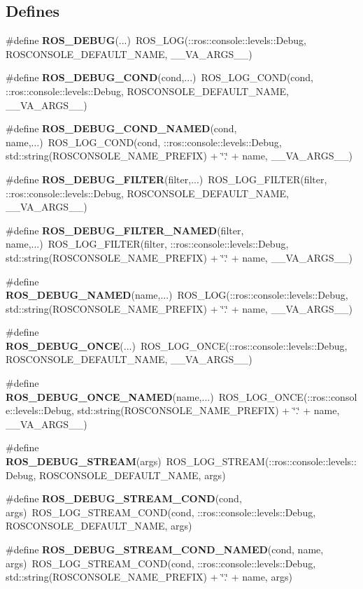 \subsection*{Defines}
\begin{DoxyCompactItemize}
\item 
\#define {\bf ROS\_\-DEBUG}(...)~ROS\_\-LOG(::ros::console::levels::Debug, ROSCONSOLE\_\-DEFAULT\_\-NAME, \_\-\_\-VA\_\-ARGS\_\-\_\-)
\item 
\#define {\bf ROS\_\-DEBUG\_\-COND}(cond,...)~ROS\_\-LOG\_\-COND(cond, ::ros::console::levels::Debug, ROSCONSOLE\_\-DEFAULT\_\-NAME, \_\-\_\-VA\_\-ARGS\_\-\_\-)
\item 
\#define {\bf ROS\_\-DEBUG\_\-COND\_\-NAMED}(cond, name,...)~ROS\_\-LOG\_\-COND(cond, ::ros::console::levels::Debug, std::string(ROSCONSOLE\_\-NAME\_\-PREFIX) + \char`\"{}.\char`\"{} + name, \_\-\_\-VA\_\-ARGS\_\-\_\-)
\item 
\#define {\bf ROS\_\-DEBUG\_\-FILTER}(filter,...)~ROS\_\-LOG\_\-FILTER(filter, ::ros::console::levels::Debug, ROSCONSOLE\_\-DEFAULT\_\-NAME, \_\-\_\-VA\_\-ARGS\_\-\_\-)
\item 
\#define {\bf ROS\_\-DEBUG\_\-FILTER\_\-NAMED}(filter, name,...)~ROS\_\-LOG\_\-FILTER(filter, ::ros::console::levels::Debug, std::string(ROSCONSOLE\_\-NAME\_\-PREFIX) + \char`\"{}.\char`\"{} + name, \_\-\_\-VA\_\-ARGS\_\-\_\-)
\item 
\#define {\bf ROS\_\-DEBUG\_\-NAMED}(name,...)~ROS\_\-LOG(::ros::console::levels::Debug, std::string(ROSCONSOLE\_\-NAME\_\-PREFIX) + \char`\"{}.\char`\"{} + name, \_\-\_\-VA\_\-ARGS\_\-\_\-)
\item 
\#define {\bf ROS\_\-DEBUG\_\-ONCE}(...)~ROS\_\-LOG\_\-ONCE(::ros::console::levels::Debug, ROSCONSOLE\_\-DEFAULT\_\-NAME, \_\-\_\-VA\_\-ARGS\_\-\_\-)
\item 
\#define {\bf ROS\_\-DEBUG\_\-ONCE\_\-NAMED}(name,...)~ROS\_\-LOG\_\-ONCE(::ros::console::levels::Debug, std::string(ROSCONSOLE\_\-NAME\_\-PREFIX) + \char`\"{}.\char`\"{} + name, \_\-\_\-VA\_\-ARGS\_\-\_\-)
\item 
\#define {\bf ROS\_\-DEBUG\_\-STREAM}(args)~ROS\_\-LOG\_\-STREAM(::ros::console::levels::Debug, ROSCONSOLE\_\-DEFAULT\_\-NAME, args)
\item 
\#define {\bf ROS\_\-DEBUG\_\-STREAM\_\-COND}(cond, args)~ROS\_\-LOG\_\-STREAM\_\-COND(cond, ::ros::console::levels::Debug, ROSCONSOLE\_\-DEFAULT\_\-NAME, args)
\item 
\#define {\bf ROS\_\-DEBUG\_\-STREAM\_\-COND\_\-NAMED}(cond, name, args)~ROS\_\-LOG\_\-STREAM\_\-COND(cond, ::ros::console::levels::Debug, std::string(ROSCONSOLE\_\-NAME\_\-PREFIX) + \char`\"{}.\char`\"{} + name, args)

\end{DoxyCompactItemize}
